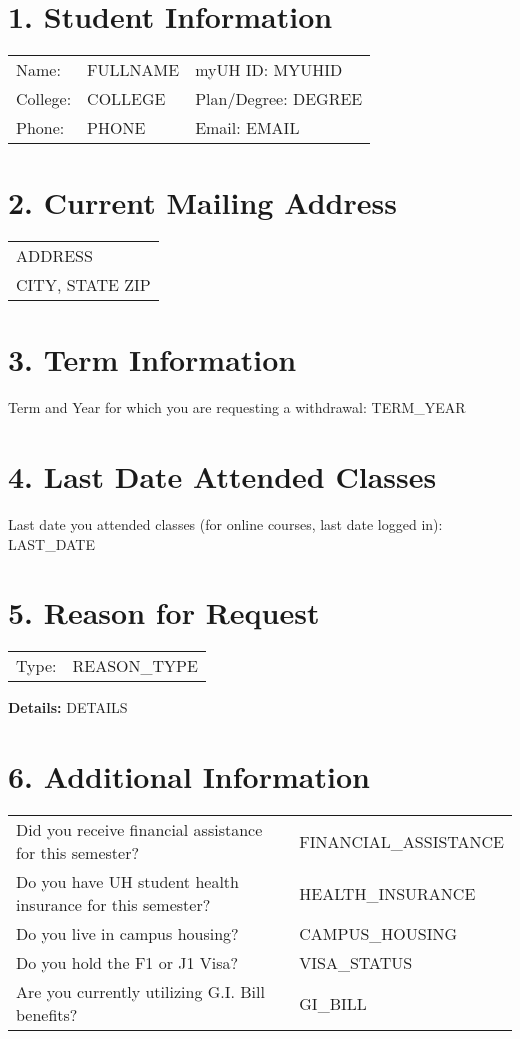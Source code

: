 \documentclass[12pt]{article}
\begin{document}
\section*{1. Student Information}
\begin{tabular}{l l l}
Name: & FULLNAME & myUH ID: MYUHID \\
College: & COLLEGE & Plan/Degree: DEGREE \\
Phone: & PHONE & Email: EMAIL \\
\end{tabular}

\section*{2. Current Mailing Address}
\begin{tabular}{l}
ADDRESS \\
CITY, STATE ZIP \\
\end{tabular}

\section*{3. Term Information}
Term and Year for which you are requesting a withdrawal: TERM\_YEAR

\section*{4. Last Date Attended Classes}
Last date you attended classes (for online courses, last date logged in): LAST\_DATE

\section*{5. Reason for Request}
\begin{tabular}{l l}
Type: & REASON\_TYPE \\
\end{tabular}

\vspace{0.5cm}
\textbf{Details:} DETAILS

\section*{6. Additional Information}
\begin{tabular}{l l}
Did you receive financial assistance for this semester? & FINANCIAL\_ASSISTANCE \\
Do you have UH student health insurance for this semester? & HEALTH\_INSURANCE \\
Do you live in campus housing? & CAMPUS\_HOUSING \\
Do you hold the F1 or J1 Visa? & VISA\_STATUS \\
Are you currently utilizing G.I. Bill benefits? & GI\_BILL \\
\end{tabular}
\end{document}
